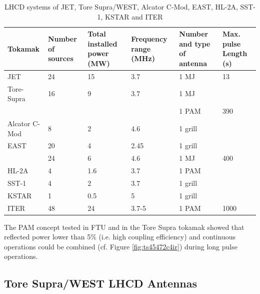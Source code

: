 \begin{table}
	\begin{tabularx}{\textwidth}{|X|X|X|X|X|X|}
		\hline
		Tokamak	& Number of sources & Total installed power (MW) &	Frequency range (MHz) &	Number and type of antenna & 	Max. pulse Length (s) \\
		\hline\hline
		JET				& 24	& 15	& 3.7 	& 1 MJ	& 13  	\\
		Tore-Supra 		& 16 	& 9		& 3.7	& 1 MJ 	& 		\\
		&    	&  		&      	& 1 PAM 			& 390 	\\
		Alcator C-Mod	& 8		& 2		& 4.6	& 1 grill			& 		\\
		EAST			& 20 	& 4 	& 2.45 	& 1 grill 			& 		\\
		& 24	& 6 	& 4.6	& 1 MJ	& 400 	\\
		HL-2A 			& 4 	& 1.6	& 3.7	& 1 PAM 			& 		\\
		SST-1 			& 4 	& 2		& 3.7 	& 1 grill			&	 	\\
		KSTAR 			& 1 	& 0.5	& 5 	& 1 grill			& 		\\
		ITER 			& 48	& 24 	& 3.7-5 & 1 PAM				& 1000 	\\
		\hline
	\end{tabularx}
	\caption{LHCD systems of JET, Tore Supra/WEST, Alcator C-Mod, EAST, HL-2A, SST-1, KSTAR and ITER}
	\label{tab:recentLHCDsystems}
\end{table}

The PAM concept tested in FTU and in the Tore Supra tokamak showed that reflected power lower than 5\% (i.e. high coupling efficiency) and continuous operations could be combined (cf. Figure \ref{fig:ts45472c4ir}) during long pulse operations. 






\subsection{Tore Supra/WEST LHCD Antennas}


